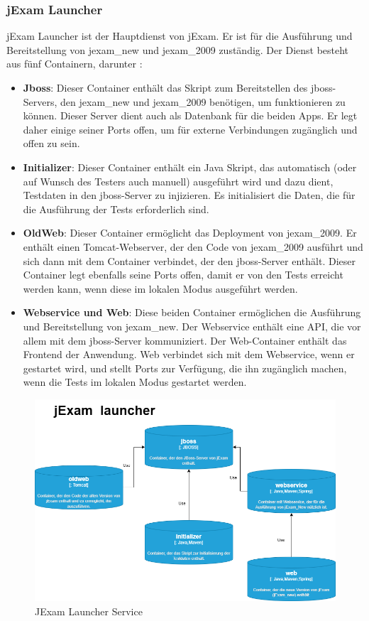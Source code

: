 \subsubsection{jExam Launcher}

jExam Launcher ist der Hauptdienst von jExam. Er ist für die Ausführung
und Bereitstellung von \Gls{jexam_new} und \Gls{jexam_2009} zuständig. Der Dienst
besteht aus fünf Containern, darunter :

\begin{itemize}
    \setlength\itemsep{1em}

    \item[] \textbf{Jboss}: Dieser Container enthält das Skript zum
    Bereitstellen des jboss-Servers, den \Gls{jexam_new} und \Gls{jexam_2009}
    benötigen, um funktionieren zu können. Dieser Server dient auch
    als Datenbank für die beiden Apps. Er legt daher einige seiner
    Ports offen, um für externe Verbindungen zugänglich und offen
    zu sein.

    \item[] \textbf{Initializer}: Dieser Container enthält ein
    Java Skript, das automatisch (oder auf Wunsch des Testers auch
    manuell) ausgeführt wird und dazu dient, Testdaten in den 
    jboss-Server zu injizieren. Es initialisiert die Daten, die für 
    die Ausführung der Tests erforderlich sind.

    \item[] \textbf{OldWeb}: Dieser Container ermöglicht das
    Deployment von \Gls{jexam_2009}. Er enthält einen Tomcat-Webserver,
    der den Code von \Gls{jexam_2009} ausführt und sich dann mit
    dem Container verbindet, der den jboss-Server enthält. 
    Dieser Container legt ebenfalls seine Ports offen, damit er
    von den Tests erreicht werden kann, wenn diese im lokalen 
    Modus ausgeführt werden.

    \item[] \textbf{Webservice und Web}: Diese beiden Container
    ermöglichen die Ausführung und Bereitstellung von
    \Gls{jexam_new}. Der Webservice enthält eine API, die vor
    allem mit dem jboss-Server kommuniziert. Der Web-Container
    enthält das Frontend der Anwendung. Web verbindet sich mit
    dem Webservice, wenn er gestartet wird, und stellt Ports zur
    Verfügung, die ihn zugänglich machen, wenn die Tests im
    lokalen Modus gestartet werden.
\end{itemize}

\begin{figure}[H]
    \centering
    \includegraphics[scale=0.6]{images/launcher.drawio}
    \caption{JExam Launcher Service} \label{fig:laucher}
\end{figure}